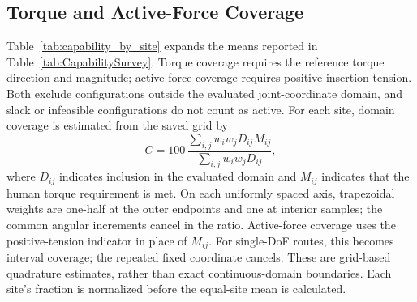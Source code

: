 \subsection{Torque and Active-Force Coverage}

Table~\ref{tab:capability_by_site} expands the means reported in Table~\ref{tab:CapabilitySurvey}. Torque coverage requires the reference torque direction and magnitude; active-force coverage requires positive insertion tension. Both exclude configurations outside the evaluated joint-coordinate domain, and slack or infeasible configurations do not count as active. For each site, domain coverage is estimated from the saved grid by
\begin{equation}
C=100\,\frac{\sum_{i,j} w_iw_j D_{ij}M_{ij}}{\sum_{i,j}w_iw_jD_{ij}},
\label{eq:angular_domain_coverage}
\end{equation}
where $D_{ij}$ indicates inclusion in the evaluated domain and $M_{ij}$ indicates that the human torque requirement is met. On each uniformly spaced axis, trapezoidal weights are one-half at the outer endpoints and one at interior samples; the common angular increments cancel in the ratio. Active-force coverage uses the positive-tension indicator in place of $M_{ij}$. For single-DoF routes, this becomes interval coverage; the repeated fixed coordinate cancels. These are grid-based quadrature estimates, rather than exact continuous-domain boundaries. Each site's fraction is normalized before the equal-site mean is calculated.

